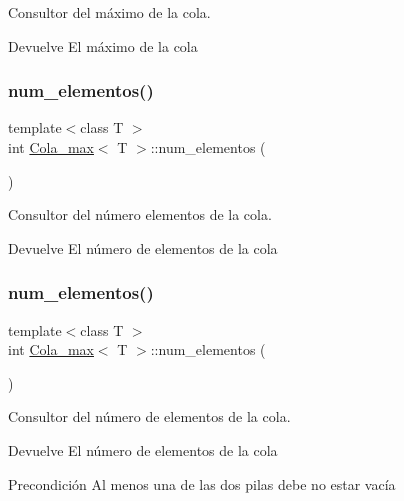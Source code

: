 Consultor del máximo de la cola. 

\begin{DoxyReturn}{Devuelve}
El máximo de la cola 
\end{DoxyReturn}
\mbox{\label{classCola__max_adb26d0a523133af1f48dca6febebf72e}} 
\subsubsection{\texorpdfstring{num\+\_\+elementos()}{num\_elementos()}\hspace{0.1cm}{\footnotesize\ttfamily [1/2]}}
{\footnotesize\ttfamily template$<$class T $>$ \\
int \hyperlink{classCola__max}{Cola\+\_\+max}$<$ T $>$\+::num\+\_\+elementos (\begin{DoxyParamCaption}{ }\end{DoxyParamCaption})}



Consultor del número elementos de la cola. 

\begin{DoxyReturn}{Devuelve}
El número de elementos de la cola 
\end{DoxyReturn}
\mbox{\label{classCola__max_adb26d0a523133af1f48dca6febebf72e}} 
\subsubsection{\texorpdfstring{num\+\_\+elementos()}{num\_elementos()}\hspace{0.1cm}{\footnotesize\ttfamily [2/2]}}
{\footnotesize\ttfamily template$<$class T $>$ \\
int \hyperlink{classCola__max}{Cola\+\_\+max}$<$ T $>$\+::num\+\_\+elementos (\begin{DoxyParamCaption}{ }\end{DoxyParamCaption})}



Consultor del número de elementos de la cola. 

\begin{DoxyReturn}{Devuelve}
El número de elementos de la cola 
\end{DoxyReturn}
\begin{DoxyPrecond}{Precondición}
Al menos una de las dos pilas debe no estar vacía 
\end{DoxyPrecond}
\mbox{\label{classCola__max_aaba30a35b89d26659408198baccee5aa}} 
